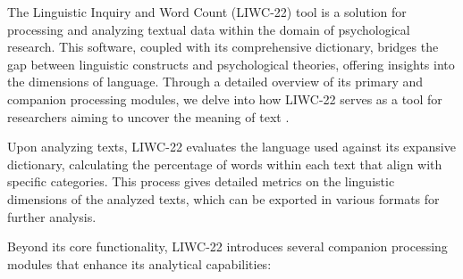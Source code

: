 \quad The Linguistic Inquiry and Word Count (LIWC-22) tool is a solution for processing and analyzing textual data within the domain of psychological research. This software, coupled with its comprehensive dictionary, bridges the gap between linguistic constructs and psychological theories, offering insights into the dimensions of language. Through a detailed overview of its primary and companion processing modules, we delve into how LIWC-22 serves as a tool for researchers aiming to uncover the meaning of text \cite{boyd2022development}.

Upon analyzing texts, LIWC-22 evaluates the language used against its expansive dictionary, calculating the percentage of words within each text that align with specific categories. This process gives detailed metrics on the linguistic dimensions of the analyzed texts, which can be exported in various formats for further analysis.

Beyond its core functionality, LIWC-22 introduces several companion processing modules that enhance its analytical capabilities:

